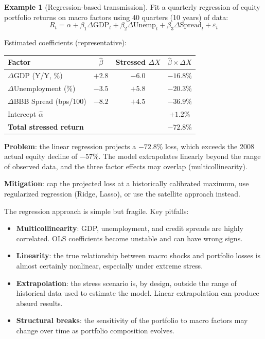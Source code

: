 \documentclass[11pt, a4paper]{article}
\theoremstyle{definition}
\newtheorem{example}{Example}[section]
\theoremstyle{plain}
\theoremstyle{remark}
\begin{document}
\begin{example}[Regression-based transmission]\label{ex:regression}
Fit a quarterly regression of equity portfolio returns on macro factors
using 40 quarters (10 years) of data:
\[
    R_t = \alpha + \beta_1 \Delta\text{GDP}_t + \beta_2 \Delta\text{Unemp}_t
    + \beta_3 \Delta\text{Spread}_t + \varepsilon_t
\]

Estimated coefficients (representative):
\begin{center}
\begin{tabular}{@{}lccc@{}}
\toprule
\textbf{Factor} & $\hat\beta$ & \textbf{Stressed $\Delta X$} & $\hat\beta \times \Delta X$ \\
\midrule
$\Delta$GDP (Y/Y, \%) & $+2.8$ & $-6.0$ & $-16.8\%$ \\
$\Delta$Unemployment (\%) & $-3.5$ & $+5.8$ & $-20.3\%$ \\
$\Delta$BBB Spread (bps/100) & $-8.2$ & $+4.5$ & $-36.9\%$ \\
\midrule
Intercept $\hat\alpha$ & \multicolumn{2}{r}{} & $+1.2\%$ \\
\midrule
\textbf{Total stressed return} & \multicolumn{2}{r}{} & $\mathbf{-72.8\%}$ \\
\bottomrule
\end{tabular}
\end{center}

\textbf{Problem}: the linear regression projects a $-72.8\%$ loss,
which exceeds the 2008 actual equity decline of $-57\%$.
The model extrapolates linearly beyond the range of observed data,
and the three factor effects may overlap (multicollinearity).

\textbf{Mitigation}: cap the projected loss at a historically calibrated maximum,
use regularized regression (Ridge, Lasso), or use the satellite approach instead.
\end{example}

\begin{warningbox}
The regression approach is simple but fragile.
Key pitfalls:
\begin{itemize}
    \item \textbf{Multicollinearity}: GDP, unemployment, and credit spreads are highly correlated.
          OLS coefficients become unstable and can have wrong signs.
    \item \textbf{Linearity}: the true relationship between macro shocks and portfolio losses
          is almost certainly nonlinear, especially under extreme stress.
    \item \textbf{Extrapolation}: the stress scenario is, by design,
          outside the range of historical data used to estimate the model.
          Linear extrapolation can produce absurd results.
    \item \textbf{Structural breaks}: the sensitivity of the portfolio to macro factors
          may change over time as portfolio composition evolves.
\end{itemize}
\end{warningbox}
\end{document}
